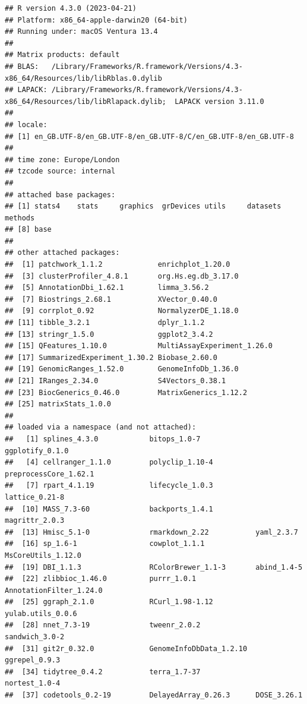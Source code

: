\documentclass[9pt,a4paper,]{extarticle}
\begin{document}
\begin{verbatim}
## R version 4.3.0 (2023-04-21)
## Platform: x86_64-apple-darwin20 (64-bit)
## Running under: macOS Ventura 13.4
## 
## Matrix products: default
## BLAS:   /Library/Frameworks/R.framework/Versions/4.3-x86_64/Resources/lib/libRblas.0.dylib 
## LAPACK: /Library/Frameworks/R.framework/Versions/4.3-x86_64/Resources/lib/libRlapack.dylib;  LAPACK version 3.11.0
## 
## locale:
## [1] en_GB.UTF-8/en_GB.UTF-8/en_GB.UTF-8/C/en_GB.UTF-8/en_GB.UTF-8
## 
## time zone: Europe/London
## tzcode source: internal
## 
## attached base packages:
## [1] stats4    stats     graphics  grDevices utils     datasets  methods  
## [8] base     
## 
## other attached packages:
##  [1] patchwork_1.1.2             enrichplot_1.20.0          
##  [3] clusterProfiler_4.8.1       org.Hs.eg.db_3.17.0        
##  [5] AnnotationDbi_1.62.1        limma_3.56.2               
##  [7] Biostrings_2.68.1           XVector_0.40.0             
##  [9] corrplot_0.92               NormalyzerDE_1.18.0        
## [11] tibble_3.2.1                dplyr_1.1.2                
## [13] stringr_1.5.0               ggplot2_3.4.2              
## [15] QFeatures_1.10.0            MultiAssayExperiment_1.26.0
## [17] SummarizedExperiment_1.30.2 Biobase_2.60.0             
## [19] GenomicRanges_1.52.0        GenomeInfoDb_1.36.0        
## [21] IRanges_2.34.0              S4Vectors_0.38.1           
## [23] BiocGenerics_0.46.0         MatrixGenerics_1.12.2      
## [25] matrixStats_1.0.0          
## 
## loaded via a namespace (and not attached):
##   [1] splines_4.3.0            bitops_1.0-7             ggplotify_0.1.0         
##   [4] cellranger_1.1.0         polyclip_1.10-4          preprocessCore_1.62.1   
##   [7] rpart_4.1.19             lifecycle_1.0.3          lattice_0.21-8          
##  [10] MASS_7.3-60              backports_1.4.1          magrittr_2.0.3          
##  [13] Hmisc_5.1-0              rmarkdown_2.22           yaml_2.3.7              
##  [16] sp_1.6-1                 cowplot_1.1.1            MsCoreUtils_1.12.0      
##  [19] DBI_1.1.3                RColorBrewer_1.1-3       abind_1.4-5             
##  [22] zlibbioc_1.46.0          purrr_1.0.1              AnnotationFilter_1.24.0 
##  [25] ggraph_2.1.0             RCurl_1.98-1.12          yulab.utils_0.0.6       
##  [28] nnet_7.3-19              tweenr_2.0.2             sandwich_3.0-2          
##  [31] git2r_0.32.0             GenomeInfoDbData_1.2.10  ggrepel_0.9.3           
##  [34] tidytree_0.4.2           terra_1.7-37             nortest_1.0-4           
##  [37] codetools_0.2-19         DelayedArray_0.26.3      DOSE_3.26.1             

\end{verbatim}
\end{document}
